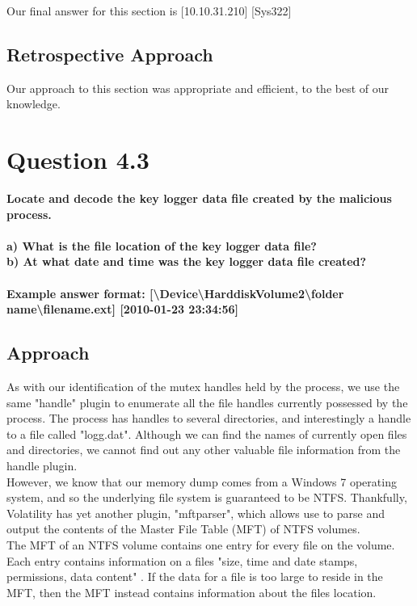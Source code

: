 Our final answer for this section is [10.10.31.210] [Sys322]

\subsection{Retrospective Approach}
Our approach to this section was appropriate and efficient, to the best of our knowledge.
\section{Question 4.3}
\textbf{Locate and decode the key logger data file created by the malicious
process.\\
\\a) What is the file location of the key logger data file?
\\b) At what date and time was the key logger data file created?
\\\\
Example answer format:
[\textbackslash{}Device\textbackslash{}HarddiskVolume2\textbackslash{}folder
name\textbackslash{}filename.ext] [2010-01-23 23:34:56]}
\subsection{Approach}

As with our identification of the mutex handles held by the process, we use the same "handle" plugin to enumerate all the file handles currently possessed by the process. The process has handles to several directories, and interestingly a handle to a file called "logg.dat". Although we can find the names of currently open files and directories, we cannot find out any other valuable file information from the handle plugin.\\

However, we know that our memory dump comes from a Windows 7 operating system, and so the underlying file system is guaranteed to be NTFS. Thankfully, Volatility has yet another plugin, "mftparser", which allows use to parse and output the contents of the Master File Table (MFT) of NTFS volumes.\\

The MFT of an NTFS volume contains one entry for every file on the volume. Each entry contains information on a files "size, time and date stamps, permissions, data content" \cite[443]{winint2}. If the data for a file is too large to reside in the MFT, then the MFT instead contains information about the files location.\\

